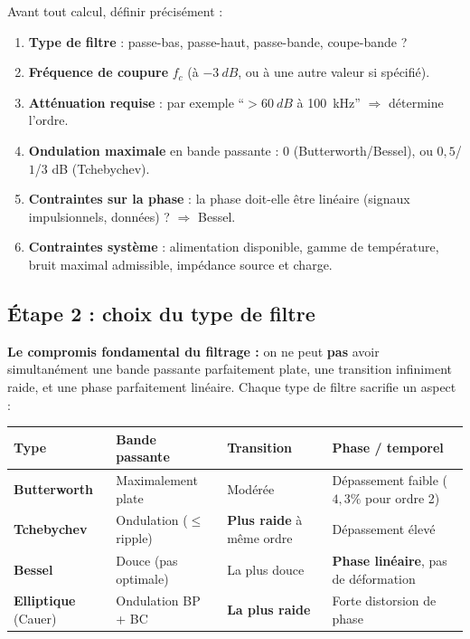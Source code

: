 \documentclass[12pt,a4paper,twoside]{book}
\begin{document}
\begin{pratique}
Avant tout calcul, définir précisément :

\begin{enumerate}[nosep]
\item \textbf{Type de filtre} : passe-bas, passe-haut, passe-bande, coupe-bande ?
\item \textbf{Fréquence de coupure} $f_c$ (à $-\SI{3}{dB}$, ou à une autre valeur si spécifié).
\item \textbf{Atténuation requise} : par exemple ``$> \SI{60}{dB}$ à \SI{100}{kHz}'' $\Rightarrow$ détermine l'ordre.
\item \textbf{Ondulation maximale} en bande passante : $0$ (Butterworth/Bessel), ou $0{,}5$/$1$/$3$ dB (Tchebychev).
\item \textbf{Contraintes sur la phase} : la phase doit-elle être linéaire (signaux impulsionnels, données) ? $\Rightarrow$ Bessel.
\item \textbf{Contraintes système} : alimentation disponible, gamme de température, bruit maximal admissible, impédance source et charge.
\end{enumerate}
\end{pratique}

\subsection{Étape 2 : choix du type de filtre}

\begin{formule}
\textbf{Le compromis fondamental du filtrage :} on ne peut \textbf{pas} avoir simultanément une bande passante parfaitement plate, une transition infiniment raide, et une phase parfaitement linéaire. Chaque type de filtre sacrifie un aspect :

\begin{center}
\renewcommand{\arraystretch}{1.5}
\begin{tabular}{p{2.5cm}p{3cm}p{3cm}p{4.5cm}}
\toprule
\textbf{Type} & \textbf{Bande passante} & \textbf{Transition} & \textbf{Phase / temporel} \\
\midrule
\textbf{Butterworth} & Maximalement plate & Modérée & Dépassement faible ($4{,}3\%$ pour ordre 2) \\
\textbf{Tchebychev} & Ondulation ($\leq$ ripple) & \textbf{Plus raide} à même ordre & Dépassement élevé \\
\textbf{Bessel} & Douce (pas optimale) & La plus douce & \textbf{Phase linéaire}, pas de déformation \\
\textbf{Elliptique} (Cauer) & Ondulation BP + BC & \textbf{La plus raide} & Forte distorsion de phase \\
\bottomrule
\end{tabular}
\end{center}
\end{formule}
\end{document}
